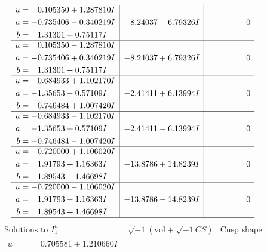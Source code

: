 \documentclass[1p]{elsarticle_modified}
\theoremstyle{definition}
\newcommand{\I}{\sqrt{-1}}
\begin{document}
$$\begin{array}{c|c|c}
\begin{aligned}
u &= \phantom{-}0.105350 + 1.287810 I \\
a &= -0.735406 - 0.340219 I \\
b &= \phantom{-}1.31301 + 0.75117 I\end{aligned}
 & -8.24037 - 6.79326 I & \phantom{-0.000000 } 0 \\ \hline\begin{aligned}
u &= \phantom{-}0.105350 - 1.287810 I \\
a &= -0.735406 + 0.340219 I \\
b &= \phantom{-}1.31301 - 0.75117 I\end{aligned}
 & -8.24037 + 6.79326 I & \phantom{-0.000000 } 0 \\ \hline\begin{aligned}
u &= -0.684933 + 1.102170 I \\
a &= -1.35653 - 0.57109 I \\
b &= -0.746484 + 1.007420 I\end{aligned}
 & -2.41411 + 6.13994 I & \phantom{-0.000000 } 0 \\ \hline\begin{aligned}
u &= -0.684933 - 1.102170 I \\
a &= -1.35653 + 0.57109 I \\
b &= -0.746484 - 1.007420 I\end{aligned}
 & -2.41411 - 6.13994 I & \phantom{-0.000000 } 0 \\ \hline\begin{aligned}
u &= -0.720000 + 1.106020 I \\
a &= \phantom{-}1.91793 + 1.16363 I \\
b &= \phantom{-}1.89543 - 1.46698 I\end{aligned}
 & -13.8786 + 14.8239 I & \phantom{-0.000000 } 0 \\ \hline\begin{aligned}
u &= -0.720000 - 1.106020 I \\
a &= \phantom{-}1.91793 - 1.16363 I \\
b &= \phantom{-}1.89543 + 1.46698 I\end{aligned}
 & -13.8786 - 14.8239 I & \phantom{-0.000000 } 0\\
 \hline 
 \end{array}$$\newpage$$\begin{array}{c|c|c}  
\text{Solutions to }I^u_{1}& \I (\text{vol} + \sqrt{-1}CS) & \text{Cusp shape}\\
 \hline 
\begin{aligned}
u &= \phantom{-}0.705581 + 1.210660 I \\

\end{aligned}
\end{array}$$
\end{document}

